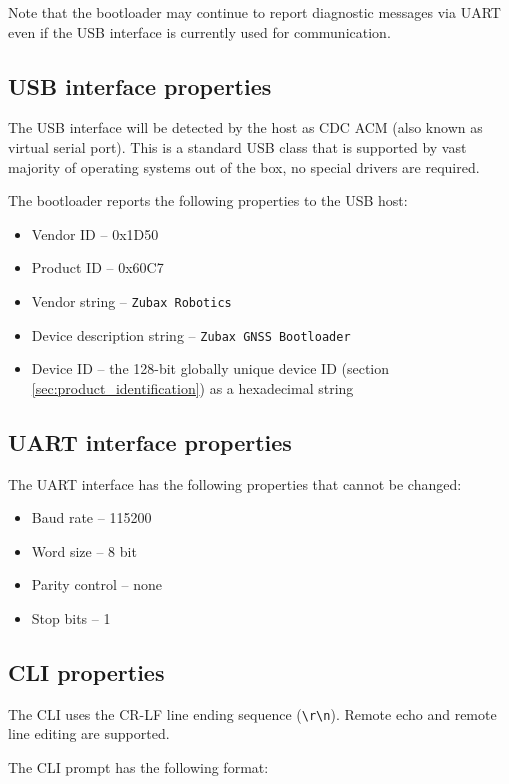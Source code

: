 \documentclass{zubaxdoc}
\begin{document}
Note that the bootloader may continue to report diagnostic messages via UART even
if the USB interface is currently used for communication.

\subsection{USB interface properties}

The USB interface will be detected by the host as CDC ACM (also known as virtual serial port).
This is a standard USB class that is supported by vast majority of operating systems out of the box,
no special drivers are required.

The bootloader reports the following properties to the USB host:
\begin{itemize}
    \item Vendor ID -- 0x1D50
    \item Product ID -- 0x60C7
    \item Vendor string -- \verb|Zubax Robotics|
    \item Device description string -- \verb|Zubax GNSS Bootloader|
    \item Device ID -- the 128-bit globally unique device ID (section \ref{sec:product_identification})
                       as a hexadecimal string
\end{itemize}

\subsection{UART interface properties}

The UART interface has the following properties that cannot be changed:
\begin{itemize}
    \item Baud rate -- 115200
    \item Word size -- 8 bit
    \item Parity control -- none
    \item Stop bits -- 1
\end{itemize}

\subsection{CLI properties}

The CLI uses the CR-LF line ending sequence (\verb|\r\n|).
Remote echo and remote line editing are supported.

The CLI prompt has the following format:
\end{document}
